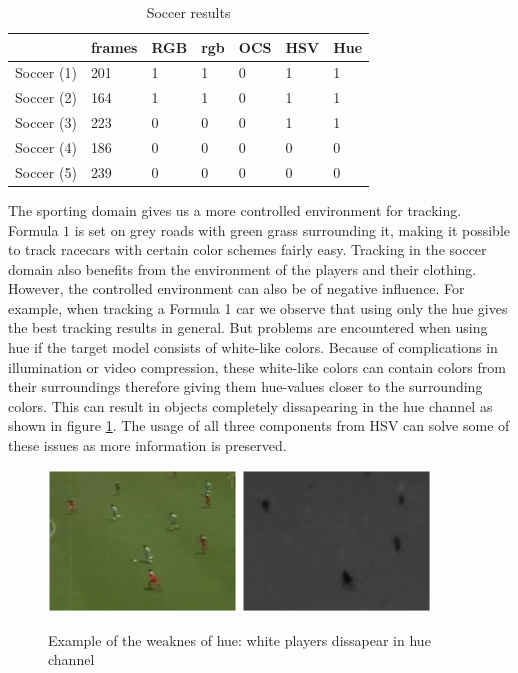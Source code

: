 \documentclass[a4paper,11pt]{article}
\begin{document}
		\begin{table}[H]
			\centering
			\begin{tabular}{| l | l | l | l | l | l | l |}
			\hline
			          & frames & RGB & rgb & OCS & HSV & Hue \\
			\hline
			Soccer (1)& 201    & 1   & 1   & 0   & 1   & 1 \\
			Soccer (2)& 164    & 1   & 1   & 0   & 1   & 1 \\
			Soccer (3)& 223    & 0   & 0   & 0   & 1   & 1 \\
			Soccer (4)& 186    & 0   & 0   & 0   & 0   & 0 \\
			Soccer (5)& 239    & 0   & 0   & 0   & 0   & 0 \\
			\hline
			\end{tabular}
			\caption{Soccer results}
			\label{table:soc}
		\end{table}
		\noindent
		The sporting domain gives us a more controlled environment for tracking. Formula $1$ is set on
		grey roads with green grass surrounding it, making it possible to track racecars with certain
		color schemes fairly easy. Tracking in the soccer domain also benefits from the environment of
		the players and their clothing. However, the controlled environment can also be of negative
		influence. For example, when tracking a Formula 1 car we observe that using only the hue gives
		the best tracking results in general. But problems are encountered when using hue if the target model consists of white-like colors. Because of complications in illumination or video compression, these white-like colors can contain colors from their surroundings therefore giving them hue-values closer to the surrounding colors. This can result in objects completely dissapearing in the hue channel as shown in figure \ref{fig:HUE}. The usage of all three components from HSV can solve some of these issues as more information is preserved.
		\begin{figure}[H]
			\begin{center}
				\includegraphics[width=5cm]{img/example_hue1.eps}
				\includegraphics[width=5cm]{img/example_hue2.eps}\\
			\end{center}
			\caption{Example of the weaknes of hue: white players dissapear in hue channel}
			\label{fig:HUE}
		\end{figure}
				
\end{document}
